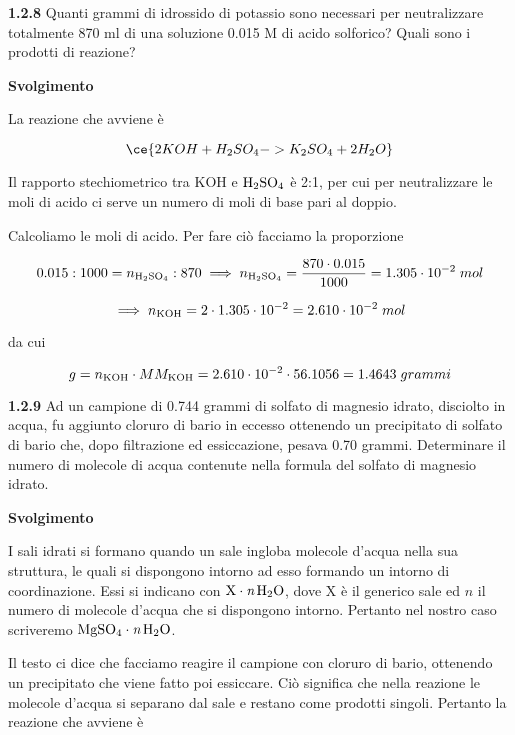\textbf{1.2.8} Quanti grammi di idrossido di potassio sono necessari per neutralizzare totalmente 870 ml di una soluzione 0.015 M di acido solforico? Quali sono i prodotti di reazione?

\vspace{0.2cm}\large\textbf{Svolgimento}\normalsize

\vspace{0.2cm}La reazione che avviene è

$$\ce{2KOH + H_2SO_4 -> K_2SO_4 + 2H_2O}$$

Il rapporto stechiometrico tra KOH e $\rm H_2SO_4$ è 2:1, per cui per neutralizzare le moli di acido ci serve un numero di moli di base pari al doppio.

Calcoliamo le moli di acido. Per fare ciò facciamo la proporzione

$$0.015:1000=n_{\rm H_2SO_4}:870
\implies
n_{\rm H_2SO_4}=\frac{870 \cdot 0.015}{1000}=1.305 \cdot 10^{-2}\;mol$$

$$\implies n_{\rm KOH}=2 \cdot 1.305 \cdot 10^{-2}=2.610 \cdot 10^{-2}\;mol$$

da cui

$$g=n_{\rm KOH} \cdot MM_{\rm KOH}
=2.610 \cdot 10^{-2} \cdot 56.1056
=1.4643\;grammi$$

\textbf{1.2.9} Ad un campione di 0.744 grammi di solfato di magnesio idrato, disciolto in acqua, fu aggiunto cloruro di bario in eccesso ottenendo un precipitato di solfato di bario che, dopo filtrazione ed essiccazione, pesava 0.70 grammi. Determinare il numero di molecole di acqua contenute nella formula del solfato di magnesio idrato.

\vspace{0.2cm}\large\textbf{Svolgimento}\normalsize

\vspace{0.2cm}I sali idrati si formano quando un sale ingloba molecole d'acqua nella sua struttura, le quali si dispongono intorno ad esso formando un intorno di coordinazione. Essi si indicano con $\rm X \cdot \textit{n}\,H_2O$, dove X è il generico sale ed $n$ il numero di molecole d'acqua che si dispongono intorno. Pertanto nel nostro caso scriveremo $\rm MgSO_4 \cdot \textit{n}\,H_2O$.

Il testo ci dice che facciamo reagire il campione con cloruro di bario, ottenendo un precipitato che viene fatto poi essiccare. Ciò significa che nella reazione le molecole d'acqua si separano dal sale e restano come prodotti singoli. Pertanto la reazione che avviene è

